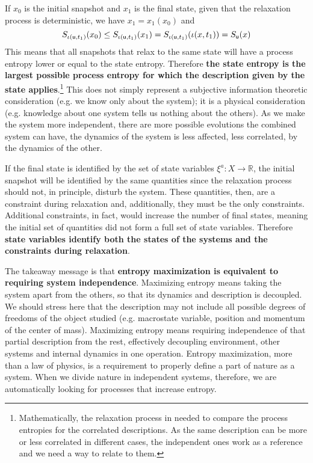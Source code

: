 \documentclass[letterpaper]{article}
\begin{document}
If $x_0$ is the initial snapshot and $x_1$ is the final state, given that the relaxation process is deterministic, we have $x_1= x_1(x_0)$ and 
\begin{equation}
S_{\iota(\stmt[u], t_1)}(x_0) \leq S_{\iota(\stmt[u], t_1)}(x_1) = S_{\iota(\stmt[u], t_1)}(\iota( x, t_1)) = S_{\stmt[u]}(x)
\end{equation}
This means that all snapshots that relax to the same state will have a process entropy lower or equal to the state entropy. Therefore \textbf{the state entropy is the largest possible process entropy for which the description given by the state applies}.\footnote{Mathematically, the relaxation process in needed to compare the process entropies for the correlated descriptions. As the same description can be more or less correlated in different cases, the independent ones work as a reference and we need a way to relate to them.} This does not simply represent a subjective information theoretic consideration (e.g. we know only about the system); it is a physical consideration (e.g. knowledge about one system tells us nothing about the others). As we make the system more independent, there are more possible evolutions the combined system can have, the dynamics of the system is less affected, less correlated, by the dynamics of the other.

If the final state is identified by the set of state variables $\xi^a : X \to \mathbb{R}$, the initial snapshot will be identified by the same quantities since the relaxation process should not, in principle, disturb the system. These quantities, then, are a constraint during relaxation and, additionally, they must be the only constraints. Additional constraints, in fact, would increase the number of final states, meaning the initial set of quantities did not form a full set of state variables. Therefore \textbf{state variables identify both the states of the systems and the constraints during relaxation}.

The takeaway message is that \textbf{entropy maximization is equivalent to requiring system independence}. Maximizing entropy means taking the system apart from the others, so that its dynamics and description is decoupled. We should stress here that the description may not include all possible degrees of freedoms of the object studied (e.g. macrostate variable, position and momentum of the center of mass). Maximizing entropy means requiring independence of that partial description from the rest, effectively decoupling environment, other systems and internal dynamics in one operation. Entropy maximization, more than a law of physics, is a requirement to properly define a part of nature as a system. When we divide nature in independent systems, therefore, we are automatically looking for processes that increase entropy.
\end{document}
